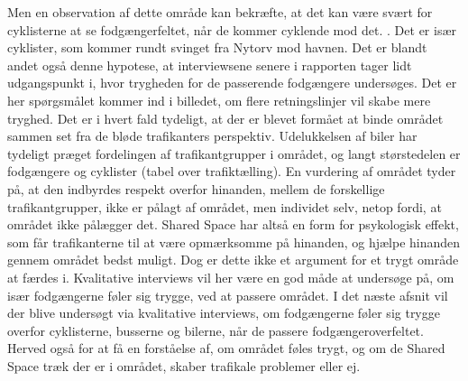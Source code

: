 Men en observation af dette område kan bekræfte, at det kan være svært for cyklisterne at se fodgængerfeltet, når de kommer cyklende mod det. . Det er især cyklister, som kommer rundt svinget fra Nytorv mod havnen. Det er blandt andet også denne hypotese, at interviewsene senere i rapporten tager lidt udgangspunkt i, hvor trygheden for de passerende fodgængere undersøges.
Det er her spørgsmålet kommer ind i billedet, om flere retningslinjer vil skabe mere tryghed. Det er i hvert fald tydeligt, at der er blevet formået at binde området sammen set fra de bløde trafikanters perspektiv. Udelukkelsen af biler har tydeligt præget fordelingen af trafikantgrupper i området, og langt størstedelen er fodgængere og cyklister (tabel over trafiktælling).
En vurdering af området tyder på, at den indbyrdes respekt overfor hinanden, mellem de forskellige trafikantgrupper, ikke er pålagt af området, men individet selv, netop fordi, at området ikke pålægger det. Shared Space har altså en form for psykologisk effekt, som får trafikanterne til at være opmærksomme på hinanden, og hjælpe hinanden gennem området bedst muligt. Dog er dette ikke et argument for et trygt område at færdes i. Kvalitative interviews vil her være en god måde at undersøge på, om især fodgængerne føler sig trygge, ved at passere området.
I det næste afsnit vil der blive undersøgt via kvalitative interviews, om fodgængerne føler sig trygge overfor cyklisterne, busserne og bilerne, når de passere fodgængeroverfeltet. Herved også for at få en forståelse af, om området føles trygt, og om de Shared Space træk der er i området, skaber trafikale problemer eller ej.
